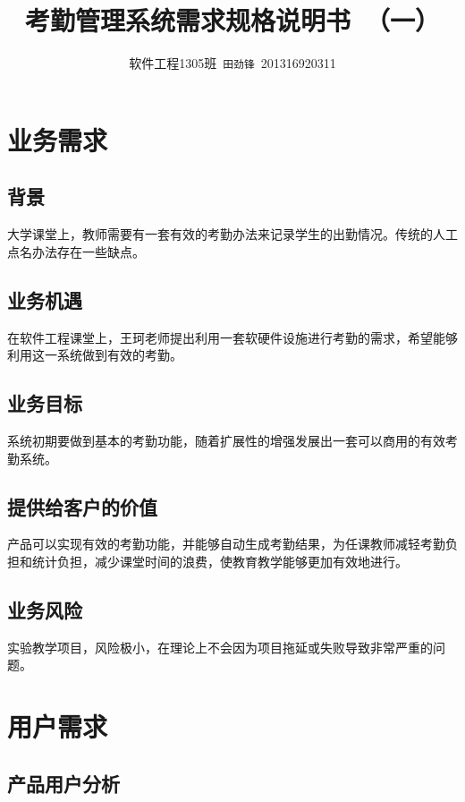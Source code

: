 \documentclass[cs4size,a4paper,nofonts]{ctexart}
\def\tjf{{\tt{田劲锋}}}
\def\titlec{考勤管理系统需求规格说明书}
\def\version{（一）}
\begin{document}

\title{\titlec~\version}
\author{软件工程1305班~\tjf~201316920311}
\maketitle

\section{业务需求}

\subsection{背景}

大学课堂上，教师需要有一套有效的考勤办法来记录学生的出勤情况。传统的人工点名办法存在一些缺点。

\subsection{业务机遇}

在软件工程课堂上，王珂老师提出利用一套软硬件设施进行考勤的需求，希望能够利用这一系统做到有效的考勤。

\subsection{业务目标}

系统初期要做到基本的考勤功能，随着扩展性的增强发展出一套可以商用的有效考勤系统。

\subsection{提供给客户的价值}

产品可以实现有效的考勤功能，并能够自动生成考勤结果，为任课教师减轻考勤负担和统计负担，减少课堂时间的浪费，使教育教学能够更加有效地进行。

\subsection{业务风险}

实验教学项目，风险极小，在理论上不会因为项目拖延或失败导致非常严重的问题。

\section{用户需求}

\subsection{产品用户分析}
\end{document}
